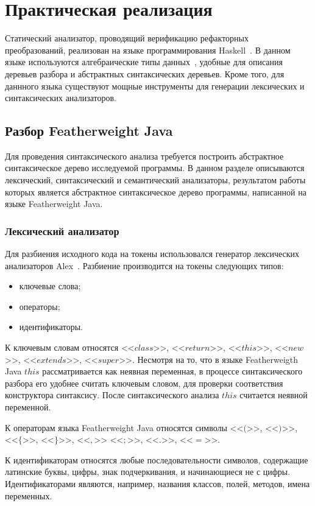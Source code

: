 \chapter{Практическая реализация}
Статический анализатор, проводящий верификацию рефакторных преобразований, реализован на языке программирования Haskell~\cite{haskell}.
В данном языке используются алгебраические типы данных~\cite{Hudak:2007:HHL:1238844.1238856}, удобные для описания деревьев разбора и абстрактных синтаксических деревьев.
Кроме того, для даннного языка существуют мощные инструменты для генерации лексических и синтаксических анализаторов.
\section{Разбор Featherweight Java}
Для проведения синтаксического анализа требуется построить абстрактное синтаксическое дерево исследуемой программы.
В данном разделе описываются лексический, синтаксический и семантический анализаторы, результатом работы которых
является абстрактное синтаксическое дерево программы, написанной на языке Featherweight Java.
\subsection{Лексический анализатор}
Для разбиения исходного кода на токены использовался генератор лексических анализаторов Alex~\cite{alex}.
Разбиение производится на токены следующих типов:
\begin{itemize}
    \item ключевые слова;
    \item операторы;
    \item идентификаторы.
\end{itemize}

К ключевым словам относятся <<$class$>>, <<$return$>>, <<$this$>>, <<$new$>>, <<$extends$>>, <<$super$>>.
Несмотря на то, что в языке Featherweigth Java $this$ рассматривается как неявная переменная,
в процессе синтаксического разбора его удобнее считать ключевым словом, для проверки соответствия конструктора синтаксису.
После синтаксического анализа $this$ считается неявной переменной.

К операторам языка Featherweight Java относятся символы <<$($>>, <<$)$>>, <<$\{$>>, <<$\}$>>, <<$,$>> <<$;$>>, <<$.$>>, <<$=$>>.

К идентификаторам относятся любые последовательности символов, содержащие латинские буквы, цифры, знак подчеркивания, и начинающиеся не с цифры.
Идентификаторами являются, например, названия классов, полей, методов, имена переменных.
